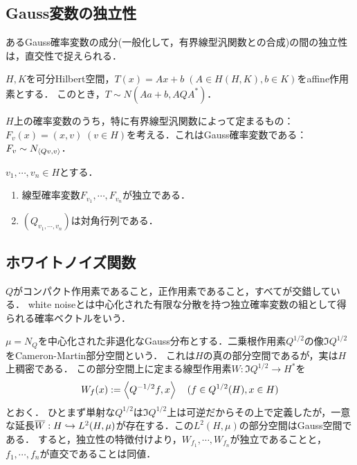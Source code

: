 \documentclass[uplatex,dvipdfmx]{jsreport}
\begin{document}
\subsection{Gauss変数の独立性}

\begin{tcolorbox}[colframe=ForestGreen, colback=ForestGreen!10!white,breakable,colbacktitle=ForestGreen!40!white,coltitle=black,fonttitle=\bfseries\sffamily,
title=]
    あるGauss確率変数の成分(一般化して，有界線型汎関数との合成)の間の独立性は，直交性で捉えられる．
\end{tcolorbox}

\begin{proposition}[Gauss変数のaffine変換]
    $H,K$を可分Hilbert空間，$T(x)=Ax+b\;(A\in H(H,K),b\in K)$をaffine作用素とする．
    このとき，$T\sim N(Aa+b,AQA^*)$．
\end{proposition}

\begin{notation}
    $H$上の確率変数のうち，特に有界線型汎関数によって定まるもの：$F_v(x)=(x,v)\;(v\in H)$を考える．これはGauss確率変数である：$F_v\sim N_{\langle Qv,v\rangle}$．
\end{notation}

\begin{proposition}[独立性の特徴付け]
    $v_1,\cdots,v_n\in H$とする．
    \begin{enumerate}
        \item 線型確率変数$F_{v_1},\cdots,F_{v_n}$が独立である．
        \item $(Q_{v_1,\cdots,v_n})$は対角行列である．
    \end{enumerate}
\end{proposition}

\subsection{ホワイトノイズ関数}

\begin{tcolorbox}[colframe=ForestGreen, colback=ForestGreen!10!white,breakable,colbacktitle=ForestGreen!40!white,coltitle=black,fonttitle=\bfseries\sffamily,
title=]
    $Q$がコンパクト作用素であること，正作用素であること，すべてが交錯している．
    white noiseとは中心化された有限な分散を持つ独立確率変数の組として得られる確率ベクトルをいう．
\end{tcolorbox}

\begin{notation}
    $\mu=N_Q$を中心化された非退化なGauss分布とする．二乗根作用素$Q^{1/2}$の像$\Im Q^{1/2}$をCameron-Martin部分空間という．
    これは$H$の真の部分空間であるが，実は$H$上稠密である．
    この部分空間上に定まる線型作用素$W:\Im Q^{1/2}\to H^*$を
    \[W_f(x):=\left\langle Q^{-1/2}f,x\right\rangle\quad(f\in Q^{1/2}(H),x\in H)\]
    とおく．
    ひとまず単射な$Q^{1/2}$は$\Im Q^{1/2}$上は可逆だからその上で定義したが，一意な延長$\overline{W}:H\hookrightarrow L^2(H,\mu)$が存在する．この$L^2(H,\mu)$の部分空間はGauss空間である．
    すると，独立性の特徴付けより，$W_{f_1},\cdots,W_{f_n}$が独立であることと，$f_1,\cdots,f_n$が直交であることは同値．
\end{notation}
\end{document}
